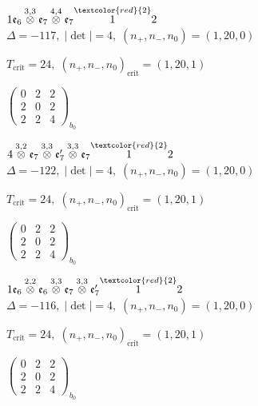 \documentclass[10pt]{article}
\begin{document}
$1\mathfrak{e}_6\overset{3,3}{\otimes}\mathfrak{e}_7\overset{4,4}{\otimes}\mathfrak{e}_7\overset{\textcolor{red}{2}}{1}2$ \quad $\Delta=-117,\; |\det|=4,\; (n_+,n_-,n_0)=(1,20,0)$

\hspace{1em}$T_{\text{crit}}=24,\; (n_+,n_-,n_0)_{\text{crit}}=(1,20,1)$

\hspace{2em}$\left(\begin{smallmatrix}0 & 2 & 2 \\ 2 & 0 & 2 \\ 2 & 2 & 4\end{smallmatrix}\right)_{\!b_0}$

\smallskip

$4\overset{3,2}{\otimes}\mathfrak{e}_7\overset{3,3}{\otimes}\mathfrak{e}_7'\overset{3,3}{\otimes}\mathfrak{e}_7\overset{\textcolor{red}{2}}{1}2$ \quad $\Delta=-122,\; |\det|=4,\; (n_+,n_-,n_0)=(1,20,0)$

\hspace{1em}$T_{\text{crit}}=24,\; (n_+,n_-,n_0)_{\text{crit}}=(1,20,1)$

\hspace{2em}$\left(\begin{smallmatrix}0 & 2 & 2 \\ 2 & 0 & 2 \\ 2 & 2 & 4\end{smallmatrix}\right)_{\!b_0}$

\smallskip

$1\mathfrak{e}_6\overset{2,2}{\otimes}\mathfrak{e}_6\overset{3,3}{\otimes}\mathfrak{e}_7\overset{3,3}{\otimes}\mathfrak{e}_7'\overset{\textcolor{red}{2}}{1}2$ \quad $\Delta=-116,\; |\det|=4,\; (n_+,n_-,n_0)=(1,20,0)$

\hspace{1em}$T_{\text{crit}}=24,\; (n_+,n_-,n_0)_{\text{crit}}=(1,20,1)$

\hspace{2em}$\left(\begin{smallmatrix}0 & 2 & 2 \\ 2 & 0 & 2 \\ 2 & 2 & 4\end{smallmatrix}\right)_{\!b_0}$
\end{document}
